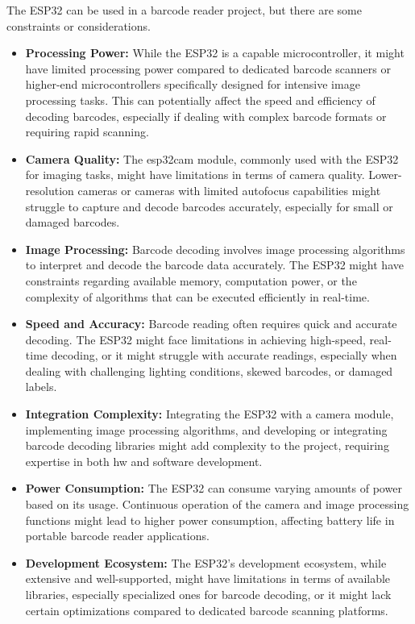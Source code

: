 The ESP32 can be used in a barcode reader project, but there are some constraints or considerations. 

\begin{itemize}
    \item \textbf{Processing Power:} While the ESP32 is a capable microcontroller, it might have limited processing power compared to dedicated barcode scanners or higher-end microcontrollers specifically designed for intensive image processing tasks. This can potentially affect the speed and efficiency of decoding barcodes, especially if dealing with complex barcode formats or requiring rapid scanning.
    \item \textbf{Camera Quality:} The \ac{esp32cam} module, commonly used with the ESP32 for imaging tasks, might have limitations in terms of camera quality. Lower-resolution cameras or cameras with limited autofocus capabilities might struggle to capture and decode barcodes accurately, especially for small or damaged barcodes.
    \item \textbf{Image Processing:} Barcode decoding involves image processing algorithms to interpret and decode the barcode data accurately. The ESP32 might have constraints regarding available memory, computation power, or the complexity of algorithms that can be executed efficiently in real-time.
    \item \textbf{Speed and Accuracy:} Barcode reading often requires quick and accurate decoding. The ESP32 might face limitations in achieving high-speed, real-time decoding, or it might struggle with accurate readings, especially when dealing with challenging lighting conditions, skewed barcodes, or damaged labels.
    \item \textbf{Integration Complexity:} Integrating the ESP32 with a camera module, implementing image processing algorithms, and developing or integrating barcode decoding libraries might add complexity to the project, requiring expertise in both \ac{hw} and software development.
    \item \textbf{Power Consumption:} The ESP32 can consume varying amounts of power based on its usage. Continuous operation of the camera and image processing functions might lead to higher power consumption, affecting battery life in portable barcode reader applications.
    \item \textbf{Development Ecosystem:} The ESP32's development ecosystem, while extensive and well-supported, might have limitations in terms of available libraries, especially specialized ones for barcode decoding, or it might lack certain optimizations compared to dedicated barcode scanning platforms. 
\end{itemize}

